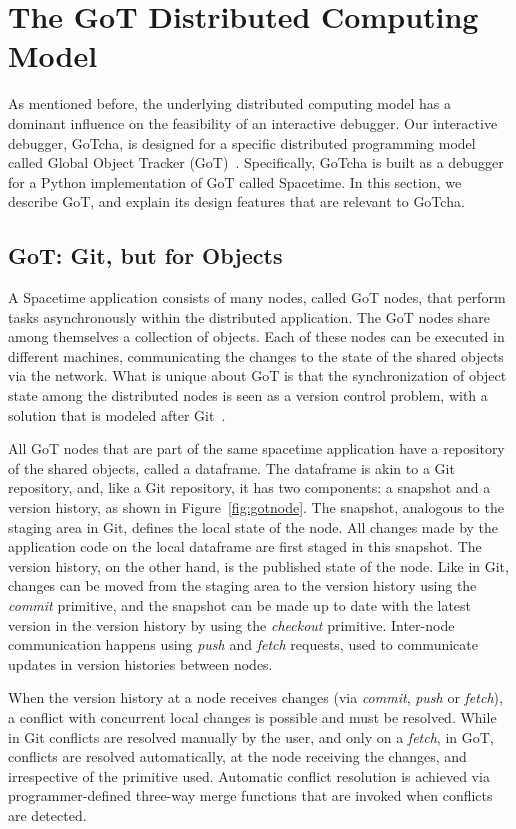 \section{The GoT Distributed Computing Model}
\label{sec:spacetime}
As mentioned before, the underlying distributed computing model has a dominant influence on the feasibility of an interactive debugger. Our interactive debugger, GoTcha, is designed for a specific distributed programming model called Global Object Tracker (GoT)~\cite{got}. Specifically, GoTcha is built as a debugger for a Python implementation of GoT called Spacetime. In this section, we describe GoT, and explain its design features that are relevant to GoTcha. 

\subsection{GoT: Git, but for Objects}
A Spacetime application consists of many nodes, called GoT nodes, that perform tasks asynchronously within the distributed application. The GoT nodes share among themselves a collection of objects. Each of these nodes can be executed in different machines, communicating the changes to the state of the shared objects via the network. What is unique about GoT is that the synchronization of object state among the distributed nodes is seen as a version control problem, with a solution that is modeled after Git~\cite{got}. 

All GoT nodes that are part of the same spacetime application have a repository of the shared objects, called a dataframe. The dataframe is akin to a Git repository, and, like a Git repository, it has two components: a snapshot and a version history, as shown in Figure~\ref{fig:gotnode}. The snapshot, analogous to the staging area in Git, defines the local state of the node. All changes made by the application code on the local dataframe are first staged in this snapshot. The version history, on the other hand, is the published state of the node. Like in Git, changes can be moved from the staging area to the version history using the {\em commit} primitive, and the snapshot can be made up to date with the latest version in the version history by using the {\em checkout} primitive. Inter-node communication happens using {\em push} and {\em fetch} requests, used to communicate updates in version histories between nodes. 

When the version history at a node receives changes (via {\em commit}, {\em push} or {\em fetch}), a conflict with concurrent local changes is possible and must be resolved.  While in Git conflicts are resolved manually by the user, and only on a {\em fetch}, in GoT, conflicts are resolved automatically, at the node receiving the changes, and irrespective of the primitive used. Automatic conflict resolution is achieved via programmer-defined three-way merge functions that are invoked when conflicts are detected.


